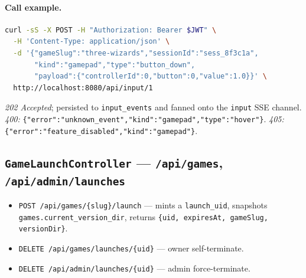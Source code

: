 
\paragraph{Call example.}
\begin{lstlisting}[language=bash]
curl -sS -X POST -H "Authorization: Bearer $JWT" \
  -H 'Content-Type: application/json' \
  -d '{"gameSlug":"three-wizards","sessionId":"sess_8f3c1a",
       "kind":"gamepad","type":"button_down",
       "payload":{"controllerId":0,"button":0,"value":1.0}}' \
  http://localhost:8080/api/input/1
\end{lstlisting}
\textit{202 Accepted}; persisted to \texttt{input\_events} and fanned
onto the \texttt{input} SSE channel.
\textit{400:} \texttt{\{"error":"unknown\_event","kind":"gamepad","type":"hover"\}}.
\textit{405:} \texttt{\{"error":"feature\_disabled","kind":"gamepad"\}}.

\subsection{\texttt{GameLaunchController} — \texttt{/api/games}, \texttt{/api/admin/launches}}

\begin{itemize}
  \item \texttt{POST /api/games/\{slug\}/launch} — mints a
        \texttt{launch\_uid}, snapshots
        \texttt{games.current\_version\_dir}, returns
        \texttt{\{uid, expiresAt, gameSlug, versionDir\}}.
  \item \texttt{DELETE /api/games/launches/\{uid\}} — owner
        self-terminate.
  \item \texttt{DELETE /api/admin/launches/\{uid\}} — admin
        force-terminate.
\end{itemize}

